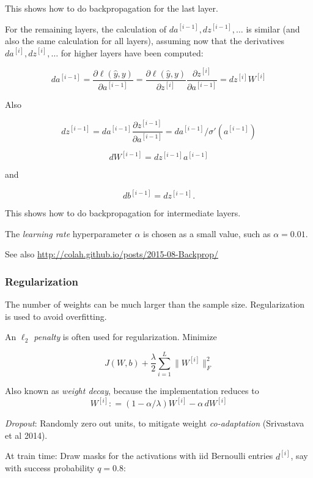 \documentclass[english]{article}
\begin{document}
This shows how to do backpropagation for the last layer. 


\item 
For the remaining layers, the calculation of $da^{[i-1]}, dz^{[i-1]}, \ldots $ is similar (and also the same calculation for all layers), assuming now that the derivatives $da^{[i]}, dz^{[i]}, \ldots $  for higher layers have been computed: 

$$d a^{[i-1]} 
= \frac{\partial \ell(\hat y, y)}{\partial  a^{[i-1]}} 
= \frac{\partial \ell(\hat y, y)}{\partial  z^{[i]}} \frac{\partial  z^{[i]}} {\partial  a^{[i-1]}}
= dz^{[i]}W^{[i]}$$

Also

$$d z^{[i-1]} 
= d a^{[i-1]}\frac{\partial  z^{[i-1]}}{\partial  a^{[i-1]}} = d a^{[i-1]}/ \sigma' (a^{[i-1]})$$

$$d W^{[i-1]} 
= d z^{[i-1]} a^{[i-1]}$$

and

$$d b^{[i-1]} = d z^{[i-1]}.$$

This shows how to do backpropagation for intermediate layers. 
\eenum 
\item The \emph{learning rate} hyperparameter $\alpha$ is chosen as a small value, such as $\alpha = 0.01$. 

\item See also \url{http://colah.github.io/posts/2015-08-Backprop/}


\eenum 
\subsubsection{Regularization}

\benum
\item The number of weights can be much larger than the sample size. Regularization is used to avoid overfitting. 

\item 
An \emph{$\ell_2$ penalty} is often used for regularization. Minimize

$$J(W,b) + \frac{\lambda}{2} \sum_{i=1}^L \|W^{[i]} \|_F^2$$

Also known as \emph{weight decay}, because the implementation reduces to 
$$W^{[i]}: = (1-\alpha/\lambda) W^{[i]} - \alpha\, dW^{[i]}$$

\item 
\emph{Dropout}: Randomly zero out units, to mitigate weight \emph{co-adaptation} (Srivastava et al 2014). 

At train time:  Draw masks for the activations with iid Bernoulli entries  $d^{[i]}$, say with success probability $q=0.8$: 
\end{document}
